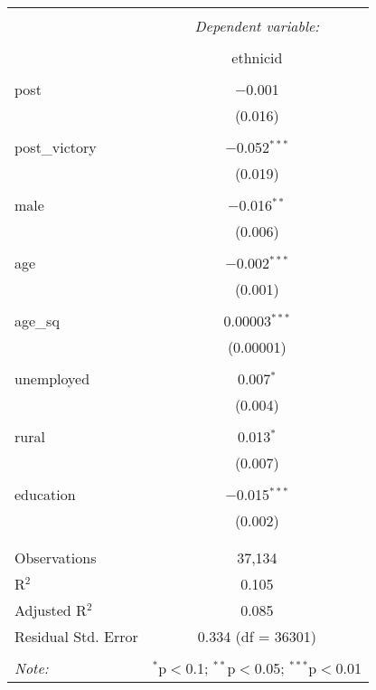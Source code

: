 
\begin{table}[!htbp] \centering 
  \caption{} 
  \label{} 
\begin{tabular}{@{\extracolsep{5pt}}lc} 
\\[-1.8ex]\hline 
\hline \\[-1.8ex] 
 & \multicolumn{1}{c}{\textit{Dependent variable:}} \\ 
\cline{2-2} 
\\[-1.8ex] & ethnicid \\ 
\hline \\[-1.8ex] 
 post & $-$0.001 \\ 
  & (0.016) \\ 
  & \\ 
 post\_victory & $-$0.052$^{***}$ \\ 
  & (0.019) \\ 
  & \\ 
 male & $-$0.016$^{**}$ \\ 
  & (0.006) \\ 
  & \\ 
 age & $-$0.002$^{***}$ \\ 
  & (0.001) \\ 
  & \\ 
 age\_sq & 0.00003$^{***}$ \\ 
  & (0.00001) \\ 
  & \\ 
 unemployed & 0.007$^{*}$ \\ 
  & (0.004) \\ 
  & \\ 
 rural & 0.013$^{*}$ \\ 
  & (0.007) \\ 
  & \\ 
 education & $-$0.015$^{***}$ \\ 
  & (0.002) \\ 
  & \\ 
\hline \\[-1.8ex] 
Observations & 37,134 \\ 
R$^{2}$ & 0.105 \\ 
Adjusted R$^{2}$ & 0.085 \\ 
Residual Std. Error & 0.334 (df = 36301) \\ 
\hline 
\hline \\[-1.8ex] 
\textit{Note:}  & \multicolumn{1}{r}{$^{*}$p$<$0.1; $^{**}$p$<$0.05; $^{***}$p$<$0.01} \\ 
\end{tabular} 
\end{table} 
